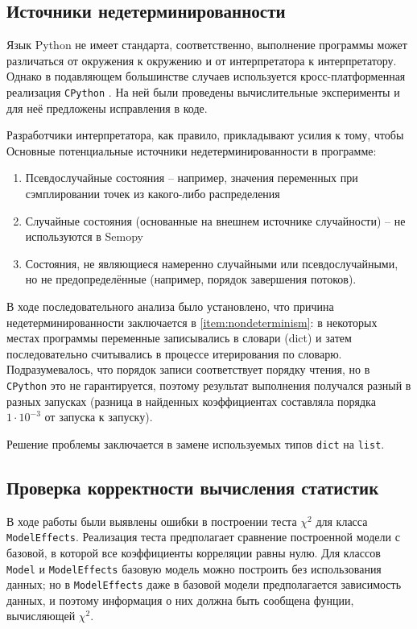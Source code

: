 
\subsection{ Источники недетерминированности }

Язык Python не имеет стандарта, соответственно, выполнение программы может различаться от окружения к окружению и от интерпретатора к интерпретатору.
Однако в подавляющем большинстве случаев используется кросс-платформенная реализация \texttt{CPython} \cite{martelli2017}.
На ней были проведены вычислительные эксперименты и для неё предложены исправления в коде.

Разработчики интерпретатора, как правило, прикладывают усилия к тому, чтобы 
Основные потенциальные источники недетерминированности в программе:

\begin{enumerate}
	\item Псевдослучайные состояния -- например, значения переменных при сэмплировании точек из какого-либо распределения
	\item Случайные состояния (основанные на внешнем источнике случайности) -- не используются в Semopy
	\item Состояния, не являющиеся намеренно случайными или псевдослучайными, но не предопределённые (например, порядок завершения потоков). \label{item:nondeterminism}
\end{enumerate}

В ходе последовательного анализа было установлено, что причина недетерминированности заключается в  \ref{item:nondeterminism}: в некоторых местах программы переменные записывались в словари (dict) и затем последовательно считывались в процессе итерирования по словарю.
Подразумевалось, что порядок записи соответствует порядку чтения, но в \texttt{CPython} это не гарантируется, поэтому результат выполнения получался разный в разных запусках (разница в найденных коэффициентах составляла порядка $ 1 \cdot 10^{-3} $ от запуска к запуску).

Решение проблемы заключается в замене используемых типов \texttt{dict} на \texttt{list}.

\subsection{ Проверка корректности вычисления статистик }

В ходе работы были выявлены ошибки в построении теста  $ \chi^2 $ для класса \texttt{ModelEffects}.
Реализация теста предполагает сравнение построенной модели с базовой, в которой все коэффициенты корреляции равны нулю.
Для классов \texttt{Model} и \texttt{ModelEffects} базовую модель можно построить без использования данных; но в \texttt{ModelEffects} даже в базовой модели предполагается зависимость данных, и поэтому информация о них должна быть сообщена фунции, вычисляющей $ \chi^2 $.

